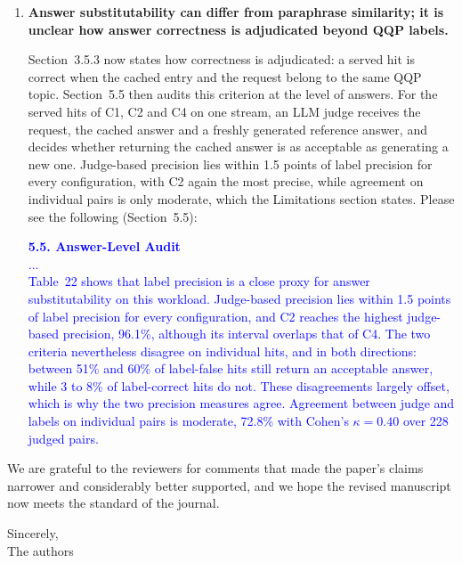 \documentclass[11pt]{article}
\begin{document}
\begin{enumerate}[leftmargin=*, itemsep=1.2em]
\item \textbf{Answer substitutability can differ from paraphrase similarity; it is unclear how answer correctness is adjudicated beyond QQP labels.}

Section~3.5.3 now states how correctness is adjudicated: a served hit is correct when the cached entry and the request belong to the same QQP topic. Section~5.5 then audits this criterion at the level of answers. For the served hits of C1, C2 and C4 on one stream, an LLM judge receives the request, the cached answer and a freshly generated reference answer, and decides whether returning the cached answer is as acceptable as generating a new one. Judge-based precision lies within 1.5 points of label precision for every configuration, with C2 again the most precise, while agreement on individual pairs is only moderate, which the Limitations section states. Please see the following (Section~5.5):

\textcolor{blue}{\textbf{5.5. Answer-Level Audit}\\
...\\
Table~22 shows that label precision is a close proxy for answer substitutability on this workload. Judge-based precision lies within 1.5 points of label precision for every configuration, and C2 reaches the highest judge-based precision, 96.1\%, although its interval overlaps that of C4. The two criteria nevertheless disagree on individual hits, and in both directions: between 51\% and 60\% of label-false hits still return an acceptable answer, while 3 to 8\% of label-correct hits do not. These disagreements largely offset, which is why the two precision measures agree. Agreement between judge and labels on individual pairs is moderate, 72.8\% with Cohen's $\kappa=0.40$ over 228 judged pairs.}

\end{enumerate}

\bigskip
\noindent We are grateful to the reviewers for comments that made the paper's claims narrower and considerably better supported, and we hope the revised manuscript now meets the standard of the journal.

\bigskip
\noindent Sincerely, \\
{The authors}
\end{document}
